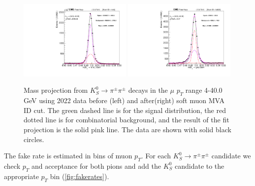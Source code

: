 \begin{figure}[!h]
  \begin{center}
    \includegraphics[width=0.49\textwidth]{figures/chapter4/fakerate/Combined_data_combined_522_2022_ks_trigger_lxy_hv0_Mass_allbin_bla.pdf}
    \includegraphics[width=0.49\textwidth]{figures/chapter4/fakerate/Combined_data_combined_522_2022_ks_trigger_lxy_hv0_Mass_muid_20_allbin_bla.pdf}\\
  \end{center}
  \caption{Mass projection from $K_S^0 \to \pi^\pm \pi^\pm$ decays in the $\mu$
    $p_{T}$ range 4-40.0 GeV using 2022 data before (left) and after(right) soft muon MVA ID cut.
    The green dashed line is for the signal distribution, the red
    dotted line is for combinatorial background, and the result of the
    fit projection is the solid pink line. The data are shown with
    solid black circles.}
  \label{fig:fit_example_pion}
\end{figure}

The fake rate is estimated in bins of muon $p_{T}$. For each $K_S^0 \to \pi^\pm \pi^\pm$ candidate we check $p_{T}$ and acceptance for both pions and add the $K_S^0$ candidate to the appropriate $p_{T}$ bin (\ref{fig:fakerates}).

